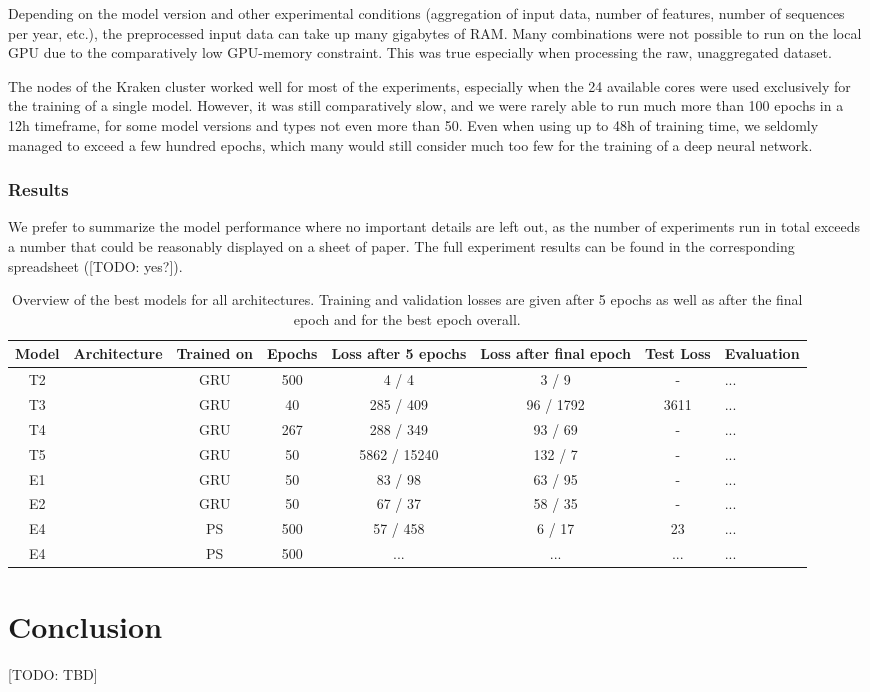 Depending on the model version and other experimental conditions (aggregation of input data, number of features, number of sequences per year, etc.), the preprocessed input data can take up many gigabytes of RAM. Many combinations were not possible to run on the local GPU due to the comparatively low GPU-memory constraint. This was true especially when processing the raw, unaggregated dataset.

The nodes of the Kraken cluster worked well for most of the experiments, especially when the 24 available cores were used exclusively for the training of a single model. However, it was still comparatively slow, and we were rarely able to run much more than 100 epochs in a 12h timeframe, for some model versions and types not even more than 50. Even when using up to 48h of training time, we seldomly managed to exceed a few hundred epochs, which many would still consider much too few for the training of a deep neural network.

\subsubsection{Results}
\label{ssst:experimental_results}
We prefer to summarize the model performance where no important details are left out, as the number of experiments run in total exceeds a number that could be reasonably displayed on a sheet of paper. The full experiment results can be found in the corresponding spreadsheet ([TODO: yes?]).

\begin{landscape}
  \begin{table}[h]
    \begin{tabularx}{\linewidth}{|c|c|c|c|c|c|c|X|}
      \hline
      Model & Architecture & Trained on & Epochs & Loss after 5 epochs & Loss after final epoch & Test Loss & Evaluation \\
      \hline
      T2 & & GRU & 500 & 4 / 4 & 3 / 9 & - & ... \\
      T3 & & GRU & 40 & 285 / 409 & 96 / 1792 & 3611 & ... \\
      T4 & & GRU & 267 & 288 / 349 & 93 / 69 & - & ... \\
      T5 & & GRU & 50 & 5862 / 15240 & 132 / 7 & - & ... \\
      E1 & & GRU & 50 & 83 / 98 & 63 / 95 & - & ... \\
      E2 & & GRU & 50 & 67 / 37 & 58 / 35 & - & ...\\
      E4 & & PS & 500 & 57 / 458 & 6 / 17 & 23 & ...\\
      E4 & & PS & 500 & ... & ... & ... & ...\\
      \hline
    \end{tabularx}
    \caption{Overview of the best models for all architectures. Training and validation losses are given after 5 epochs as well as after the final epoch and for the best epoch overall.}
    \label{tab:experimental_results}
  \end{table}
\end{landscape}

\clearpage
\section{Conclusion}
[TODO: TBD]
